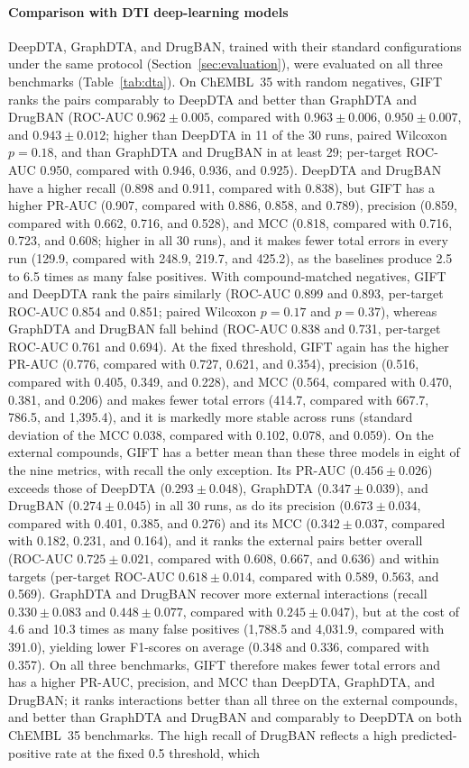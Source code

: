 \documentclass[11pt,letterpaper]{article}
\begin{document}
\paragraph{Comparison with DTI deep-learning models}
DeepDTA, GraphDTA, and DrugBAN, trained with their standard configurations under the same protocol (Section~\ref{sec:evaluation}), were evaluated on all three benchmarks (Table~\ref{tab:dta}). On ChEMBL~35 with random negatives, GIFT ranks the pairs comparably to DeepDTA and better than GraphDTA and DrugBAN (ROC-AUC $0.962\pm0.005$, compared with $0.963\pm0.006$, $0.950\pm0.007$, and $0.943\pm0.012$; higher than DeepDTA in 11 of the 30 runs, paired Wilcoxon $p=0.18$, and than GraphDTA and DrugBAN in at least 29; per-target ROC-AUC 0.950, compared with 0.946, 0.936, and 0.925). DeepDTA and DrugBAN have a higher recall (0.898 and 0.911, compared with 0.838), but GIFT has a higher PR-AUC (0.907, compared with 0.886, 0.858, and 0.789), precision (0.859, compared with 0.662, 0.716, and 0.528), and MCC (0.818, compared with 0.716, 0.723, and 0.608; higher in all 30 runs), and it makes fewer total errors in every run (129.9, compared with 248.9, 219.7, and 425.2), as the baselines produce 2.5 to 6.5 times as many false positives. With compound-matched negatives, GIFT and DeepDTA rank the pairs similarly (ROC-AUC 0.899 and 0.893, per-target ROC-AUC 0.854 and 0.851; paired Wilcoxon $p=0.17$ and $p=0.37$), whereas GraphDTA and DrugBAN fall behind (ROC-AUC 0.838 and 0.731, per-target ROC-AUC 0.761 and 0.694). At the fixed threshold, GIFT again has the higher PR-AUC (0.776, compared with 0.727, 0.621, and 0.354), precision (0.516, compared with 0.405, 0.349, and 0.228), and MCC (0.564, compared with 0.470, 0.381, and 0.206) and makes fewer total errors (414.7, compared with 667.7, 786.5, and 1,395.4), and it is markedly more stable across runs (standard deviation of the MCC 0.038, compared with 0.102, 0.078, and 0.059). On the external compounds, GIFT has a better mean than these three models in eight of the nine metrics, with recall the only exception. Its PR-AUC ($0.456\pm0.026$) exceeds those of DeepDTA ($0.293\pm0.048$), GraphDTA ($0.347\pm0.039$), and DrugBAN ($0.274\pm0.045$) in all 30 runs, as do its precision ($0.673\pm0.034$, compared with 0.401, 0.385, and 0.276) and its MCC ($0.342\pm0.037$, compared with 0.182, 0.231, and 0.164), and it ranks the external pairs better overall (ROC-AUC $0.725\pm0.021$, compared with 0.608, 0.667, and 0.636) and within targets (per-target ROC-AUC $0.618\pm0.014$, compared with 0.589, 0.563, and 0.569). GraphDTA and DrugBAN recover more external interactions (recall $0.330\pm0.083$ and $0.448\pm0.077$, compared with $0.245\pm0.047$), but at the cost of 4.6 and 10.3 times as many false positives (1,788.5 and 4,031.9, compared with 391.0), yielding lower F1-scores on average (0.348 and 0.336, compared with 0.357). On all three benchmarks, GIFT therefore makes fewer total errors and has a higher PR-AUC, precision, and MCC than DeepDTA, GraphDTA, and DrugBAN; it ranks interactions better than all three on the external compounds, and better than GraphDTA and DrugBAN and comparably to DeepDTA on both ChEMBL~35 benchmarks. The high recall of DrugBAN reflects a high predicted-positive rate at the fixed 0.5 threshold, which 
\end{document}
